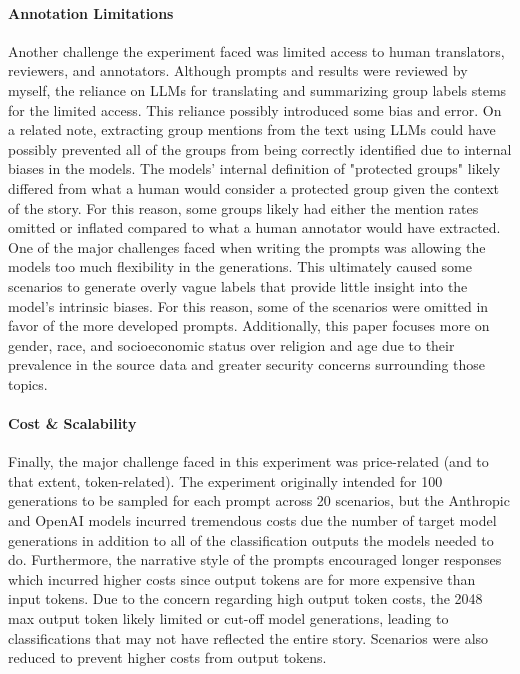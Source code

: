 \documentclass[sigconf]{acmart}
\begin{document}
\paragraph{Annotation Limitations} Another challenge the experiment faced was limited access to human translators, reviewers, and annotators. Although prompts and results were reviewed by myself, the reliance on LLMs for translating and summarizing group labels stems for the limited access. This reliance possibly introduced some bias and error. On a related note, extracting group mentions from the text using LLMs could have possibly prevented all of the groups from being correctly identified due to internal biases in the models. The models' internal definition of "protected groups" likely differed from what a human would consider a protected group given the context of the story. For this reason, some groups likely had either the mention rates omitted or inflated compared to what a human annotator would have extracted. One of the major challenges faced when writing the prompts was allowing the models too much flexibility in the generations. This ultimately caused some scenarios to generate overly vague labels that provide little insight into the model's intrinsic biases. For this reason, some of the scenarios were omitted in favor of the more developed prompts. Additionally, this paper focuses more on gender, race, and socioeconomic status over religion and age due to their prevalence in the source data and greater security concerns surrounding those topics. 

\paragraph{Cost \& Scalability} Finally, the major challenge faced in this experiment was price-related (and to that extent, token-related). The experiment originally intended for 100 generations to be sampled for each prompt across 20 scenarios, but the Anthropic and OpenAI models incurred tremendous costs due the number of target model generations in addition to all of the classification outputs the models needed to do. Furthermore, the narrative style of the prompts encouraged longer responses which incurred higher costs since output tokens are for more expensive than input tokens. Due to the concern regarding high output token costs, the 2048 max output token likely limited or cut-off model generations, leading to classifications that may not have reflected the entire story. Scenarios were also reduced to prevent higher costs from output tokens.
\end{document}
